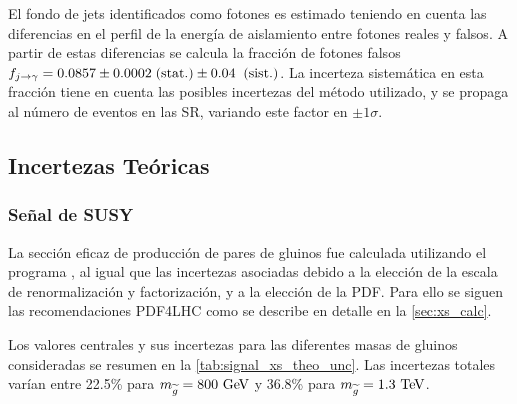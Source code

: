 El fondo de jets identificados como fotones es estimado teniendo en cuenta las
diferencias en el perfil de la energía de aislamiento entre fotones reales y falsos. A partir
de estas diferencias se calcula la fracción de fotones falsos $f_{j\rightarrow\gamma} = 0.0857 \pm 0.0002 \mbox{$\;$(stat.)} \pm 0.04 \;\mbox{$\;$(sist.)}$.
La incerteza sistemática en esta fracción tiene en cuenta las posibles incertezas
del método utilizado, y se propaga al número de eventos en las SR, variando
este factor en $\pm 1\sigma$.



\subsection{Incertezas Teóricas}\label{sec:theosyst}


\subsubsection{Señal de SUSY}\label{sec:syst_signal}

La sección eficaz de producción de pares de gluinos fue calculada utilizando
el programa {\nllfast}, al igual que las incertezas asociadas debido a la elección
de la escala de renormalización y factorización, y a la elección de la PDF.
Para ello se siguen las recomendaciones PDF4LHC \cite{Botje:2011sn} como
se describe en detalle en la \cref{sec:xs_calc}.

Los valores centrales y sus incertezas para las diferentes masas de gluinos consideradas se resumen en
la \cref{tab:signal_xs_theo_unc}. Las incertezas totales varían entre 22.5\% para $m_{\gluino} = 800\GeV$
y 36.8\% para $m_{\gluino} = 1.3 \tev$.

